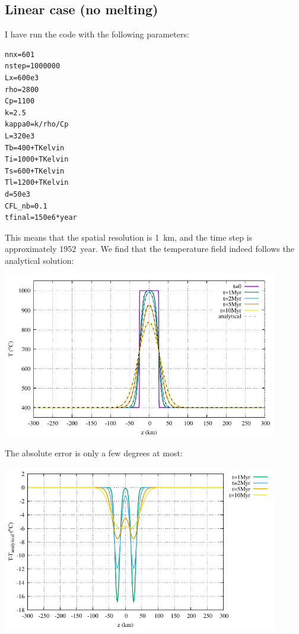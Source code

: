 \subsection*{Linear case (no melting)}

I have run the code with the following parameters:
\begin{lstlisting}
nnx=601
nstep=1000000
Lx=600e3
rho=2800
Cp=1100
k=2.5
kappa0=k/rho/Cp
L=320e3
Tb=400+TKelvin
Ti=1000+TKelvin
Ts=600+TKelvin
Tl=1200+TKelvin
d=50e3
CFL_nb=0.1
tfinal=150e6*year
\end{lstlisting}
This means that the spatial resolution is 1~km, and the time step is approximately 1952~year. 
We find that the temperature field indeed follows the analytical solution:
\begin{center}
\includegraphics[width=12cm]{python_codes/fieldstone_169/results/linear/T.pdf}
\end{center}
The absolute error is only a few degrees at most:
\begin{center}
\includegraphics[width=12cm]{python_codes/fieldstone_169/results/linear/T_error.pdf}
\end{center}


